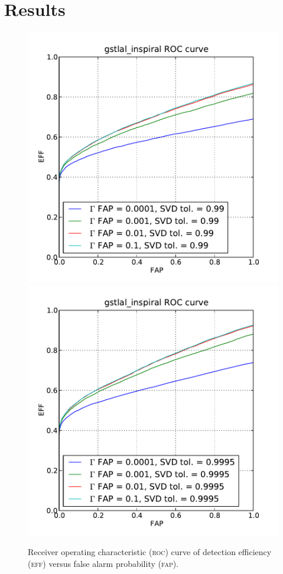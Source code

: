 \section{Results}
\label{SECIV}\label{sec:results}


\begin{figure}[htbp]
\begin{center}
\includegraphics[scale=0.4]{figures/roc_99.pdf}
\includegraphics[scale=0.4]{figures/roc_9995.pdf}
\caption{Receiver operating characteristic (\textsc{roc}) curve of detection efficiency (\textsc{eff}) versus false alarm probability (\textsc{fap}).}
\label{fig:roc}
\end{center}
\end{figure}
